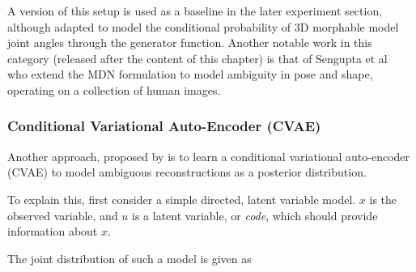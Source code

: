 A version of this setup is used as a baseline in the later experiment section, although adapted to model the conditional probability of 3D morphable model joint angles through the generator function. Another notable work in this category (released after the content of this chapter) is that of Sengupta et al~ who extend the MDN formulation to model ambiguity in pose and shape, operating on a collection of human images. 

\subsubsection{Conditional Variational Auto-Encoder (CVAE)}

Another approach, proposed by \citet{sharma19monocular} is to learn a conditional variational auto-encoder (CVAE) to model ambiguous reconstructions as a posterior distribution. 

To explain this, first consider a simple directed, latent variable model. $x$ is the observed variable, and $u$ is a latent variable, or \emph{code}, which should provide information about $x$.


\begin{center}
  \end{center}

The joint distribution of such a model is given as

